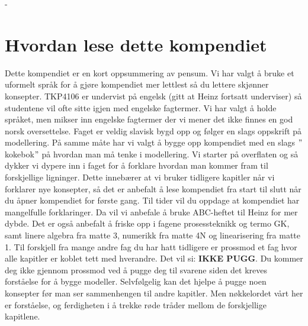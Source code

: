 \clearpage-
\section{Hvordan lese dette kompendiet}\label{sec:lese}
Dette kompendiet er en kort oppsummering av pensum. Vi har valgt å bruke et uformelt språk for å gjøre kompendiet mer lettlest så du lettere skjønner konsepter. TKP4106 er undervist på engelsk (gitt at Heinz fortsatt underviser) så studentene vil ofte sitte igjen med engelske fagtermer. Vi har valgt å holde språket, men  mikser inn engelske fagtermer der vi mener det ikke finnes en god norsk oversettelse. Faget er veldig slavisk bygd opp og følger en slags oppskrift på modellering. På samme måte har vi valgt å bygge opp kompendiet med en slags $"$kokebok$"$ på hvordan man må tenke i modellering. Vi starter på overflaten og så dykker vi dypere inn i faget for å forklare hvordan man kommer fram til forskjellige ligninger. Dette innebærer at vi bruker tidligere kapitler når vi forklarer nye konsepter, så det er anbefalt å lese kompendiet fra start til slutt når du åpner kompendiet for første gang. Til tider vil du oppdage at kompendiet har mangelfulle forklaringer. Da vil vi anbefale å bruke ABC-heftet til Heinz for mer dybde. Det er også anbefalt å friske opp i fagene prosessteknikk og termo GK, samt linere algebra fra matte 3, numerikk fra matte 4N og linearisering fra matte 1. Til forskjell fra mange andre fag du har hatt tidligere er prossmod et fag hvor alle kapitler er koblet tett med hverandre. Det vil si: \textbf{IKKE PUGG}. Du kommer deg ikke gjennom prossmod ved å pugge deg til svarene siden det kreves forståelse for å bygge modeller. Selvfølgelig kan det hjelpe å pugge noen konsepter før man ser sammenhengen til andre kapitler. Men nøkkelordet vårt her er forståelse, og ferdigheten i å trekke røde tråder mellom de forskjellige kapitlene. 